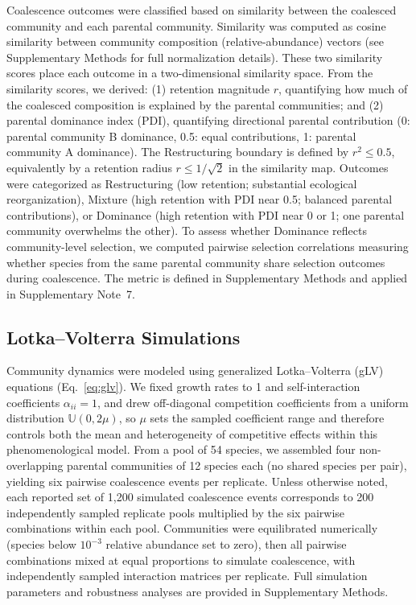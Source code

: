 Coalescence outcomes were classified based on similarity between the coalesced community and each parental community. Similarity was computed as cosine similarity between community composition (relative-abundance) vectors (see Supplementary Methods for full normalization details). These two similarity scores place each outcome in a two-dimensional similarity space. From the similarity scores, we derived: (1) retention magnitude $r$, quantifying how much of the coalesced composition is explained by the parental communities; and (2) parental dominance index (PDI), quantifying directional parental contribution (0: parental community B dominance, 0.5: equal contributions, 1: parental community A dominance). The Restructuring boundary is defined by $r^2 \leq 0.5$, equivalently by a retention radius $r \leq 1/\sqrt{2}$ in the similarity map. Outcomes were categorized as Restructuring (low retention; substantial ecological reorganization), Mixture (high retention with PDI near 0.5; balanced parental contributions), or Dominance (high retention with PDI near 0 or 1; one parental community overwhelms the other). To assess whether Dominance reflects community-level selection, we computed pairwise selection correlations measuring whether species from the same parental community share selection outcomes during coalescence. The metric is defined in Supplementary Methods and applied in Supplementary Note~7.


\subsection*{Lotka--Volterra Simulations}
\label{sec:methods:simulations}

Community dynamics were modeled using generalized Lotka--Volterra (gLV) equations (Eq.~\ref{eq:glv}). We fixed growth rates to 1 and self-interaction coefficients $\alpha_{ii} = 1$, and drew off-diagonal competition coefficients from a uniform distribution $\mathbb{U}(0, 2\mu)$, so $\mu$ sets the sampled coefficient range and therefore controls both the mean and heterogeneity of competitive effects within this phenomenological model. From a pool of 54 species, we assembled four non-overlapping parental communities of 12 species each (no shared species per pair), yielding six pairwise coalescence events per replicate. Unless otherwise noted, each reported set of 1,200 simulated coalescence events corresponds to 200 independently sampled replicate pools multiplied by the six pairwise combinations within each pool. Communities were equilibrated numerically (species below $10^{-3}$ relative abundance set to zero), then all pairwise combinations mixed at equal proportions to simulate coalescence, with independently sampled interaction matrices per replicate. Full simulation parameters and robustness analyses are provided in Supplementary Methods.


